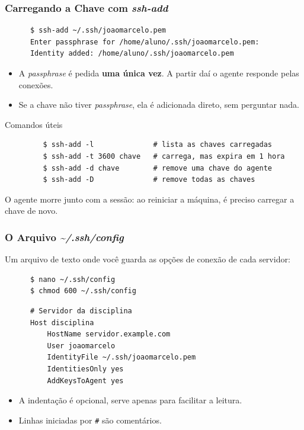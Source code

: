 \documentclass{beamer}
\begin{document}
\begin{frame}[fragile]
   \frametitle{Carregando a Chave com \textit{ssh-add}}
   \begin{verbatim}
      $ ssh-add ~/.ssh/joaomarcelo.pem
      Enter passphrase for /home/aluno/.ssh/joaomarcelo.pem:
      Identity added: /home/aluno/.ssh/joaomarcelo.pem
   \end{verbatim}
   \begin{itemize}
      \item A \textit{passphrase} é pedida \textbf{uma única vez}. A partir daí o agente responde pelas conexões.
      \item Se a chave não tiver \textit{passphrase}, ela é adicionada direto, sem perguntar nada.
   \end{itemize}
   \begin{block}{Comandos úteis}
      \begin{verbatim}
         $ ssh-add -l              # lista as chaves carregadas
         $ ssh-add -t 3600 chave   # carrega, mas expira em 1 hora
         $ ssh-add -d chave        # remove uma chave do agente
         $ ssh-add -D              # remove todas as chaves
      \end{verbatim}
   \end{block}
   O agente morre junto com a sessão: ao reiniciar a máquina, é preciso carregar a chave de novo.
\end{frame}

\begin{frame}[fragile]
   \frametitle{O Arquivo \textit{\textasciitilde/.ssh/config}}
   Um arquivo de texto onde você guarda as opções de conexão de cada servidor:
   \begin{verbatim}
      $ nano ~/.ssh/config
      $ chmod 600 ~/.ssh/config
   \end{verbatim}
   \begin{verbatim}
      # Servidor da disciplina
      Host disciplina
          HostName servidor.example.com
          User joaomarcelo
          IdentityFile ~/.ssh/joaomarcelo.pem
          IdentitiesOnly yes
          AddKeysToAgent yes
   \end{verbatim}
   \begin{itemize}
      \item A indentação é opcional, serve apenas para facilitar a leitura.
      \item Linhas iniciadas por \texttt{\#} são comentários.
   \end{itemize}
\end{frame}
\end{document}
